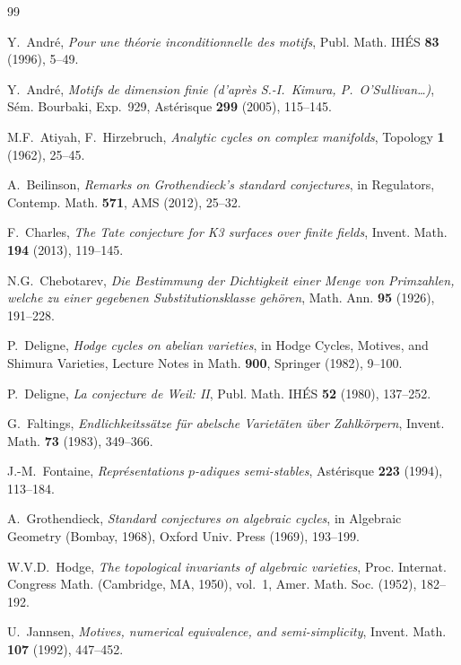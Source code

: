 \documentclass[11pt]{article}
\theoremstyle{definition}
\begin{document}
\begin{thebibliography}{99}

Y.~Andr\'e,
\textit{Pour une th\'eorie inconditionnelle des motifs},
Publ. Math. IH\'ES \textbf{83} (1996), 5--49.

Y.~Andr\'e,
\textit{Motifs de dimension finie (d'apr\`es S.-I.~Kimura, P.~O'Sullivan\ldots)},
S\'em. Bourbaki, Exp.~929, Ast\'erisque \textbf{299} (2005), 115--145.

M.F.~Atiyah, F.~Hirzebruch,
\textit{Analytic cycles on complex manifolds},
Topology \textbf{1} (1962), 25--45.

A.~Beilinson,
\textit{Remarks on Grothendieck's standard conjectures},
in Regulators, Contemp. Math. \textbf{571}, AMS (2012), 25--32.

F.~Charles,
\textit{The Tate conjecture for K3 surfaces over finite fields},
Invent. Math. \textbf{194} (2013), 119--145.

N.G.~Chebotarev,
\textit{Die Bestimmung der Dichtigkeit einer Menge von Primzahlen,
welche zu einer gegebenen Substitutionsklasse geh\"oren},
Math. Ann. \textbf{95} (1926), 191--228.

P.~Deligne,
\textit{Hodge cycles on abelian varieties},
in Hodge Cycles, Motives, and Shimura Varieties,
Lecture Notes in Math. \textbf{900}, Springer (1982), 9--100.

P.~Deligne,
\textit{La conjecture de Weil: II},
Publ. Math. IH\'ES \textbf{52} (1980), 137--252.

G.~Faltings,
\textit{Endlichkeitss\"atze f\"ur abelsche Variet\"aten \"uber
Zahlk\"orpern},
Invent. Math. \textbf{73} (1983), 349--366.

J.-M.~Fontaine,
\textit{Repr\'esentations $p$-adiques semi-stables},
Ast\'erisque \textbf{223} (1994), 113--184.

A.~Grothendieck,
\textit{Standard conjectures on algebraic cycles},
in Algebraic Geometry (Bombay, 1968), Oxford Univ. Press (1969), 193--199.

W.V.D.~Hodge,
\textit{The topological invariants of algebraic varieties},
Proc. Internat. Congress Math. (Cambridge, MA, 1950), vol.~1,
Amer. Math. Soc. (1952), 182--192.

U.~Jannsen,
\textit{Motives, numerical equivalence, and semi-simplicity},
Invent. Math. \textbf{107} (1992), 447--452.


\end{thebibliography}
\end{document}
